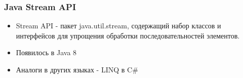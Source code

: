 \begin{frame}
\frametitle{Java Stream API} %
\begin{itemize}
	\item Stream API - пакет java.util.stream, содержащий набор классов и интерфейсов для упрощения обработки последовательностей элементов.
	\item Появилось в Java 8 
	\item Аналоги в других языках - LINQ в C\#
\end{itemize}
\end{frame}